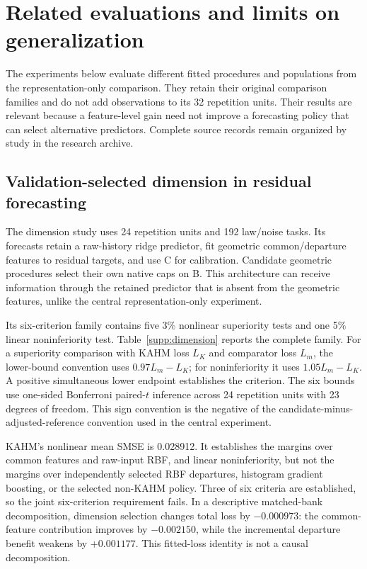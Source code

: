 
\section{Related evaluations and limits on generalization}\label{supp:related}
The experiments below evaluate different fitted procedures and populations from the representation-only comparison. They retain their original comparison families and do not add observations to its 32 repetition units. Their results are relevant because a feature-level gain need not improve a forecasting policy that can select alternative predictors. Complete source records remain organized by study in the research archive.

\subsection{Validation-selected dimension in residual forecasting}
The dimension study uses 24 repetition units and 192 law/noise tasks. Its forecasts retain a raw-history ridge predictor, fit geometric common/departure features to residual targets, and use C for calibration. Candidate geometric procedures select their own native caps on B. This architecture can receive information through the retained predictor that is absent from the geometric features, unlike the central representation-only experiment.

Its six-criterion family contains five 3\% nonlinear superiority tests and one 5\% linear noninferiority test. Table~\ref{supp:dimension} reports the complete family. For a superiority comparison with KAHM loss $L_K$ and comparator loss $L_m$, the lower-bound convention uses $0.97L_m-L_K$; for noninferiority it uses $1.05L_m-L_K$. A positive simultaneous lower endpoint establishes the criterion. The six bounds use one-sided Bonferroni paired-$t$ inference across 24 repetition units with 23 degrees of freedom. This sign convention is the negative of the candidate-minus-adjusted-reference convention used in the central experiment.

KAHM's nonlinear mean SMSE is 0.028912. It establishes the margins over common features and raw-input RBF, and linear noninferiority, but not the margins over independently selected RBF departures, histogram gradient boosting, or the selected non-KAHM policy. Three of six criteria are established, so the joint six-criterion requirement fails. In a descriptive matched-bank decomposition, dimension selection changes total loss by $-0.000973$: the common-feature contribution improves by $-0.002150$, while the incremental departure benefit weakens by $+0.001177$. This fitted-loss identity is not a causal decomposition.

